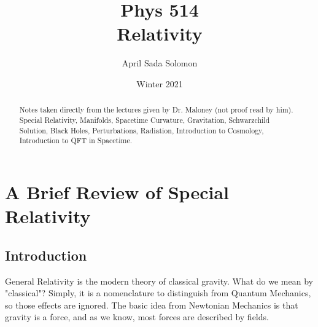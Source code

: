\documentclass{article}
\title{Phys 514 \\
	\large Relativity}
\author{April Sada Solomon}
\date{Winter 2021}
\begin{document}
	\clearpage
	\maketitle
	
	\vspace{2cm}
	
	\renewcommand{\abstractname}{Course Description}
	\begin{abstract}
		 Notes taken directly from the lectures given by Dr. Maloney (not proof read by him). Special Relativity, Manifolds, Spacetime Curvature, Gravitation, Schwarzchild Solution, Black Holes, Perturbations, Radiation, Introduction to Cosmology, Introduction to QFT in Spacetime. 
	\end{abstract}
	
	\newpage
	
	\tableofcontents
	
	\newpage
	
	\setcounter{page}{1}
	\cfoot{\thepage}
	
	\section{A Brief Review of Special Relativity}
	\subsection{Introduction}
 		General Relativity is the modern theory of classical gravity. What do we mean by "classical"? Simply, it is a nomenclature to distinguish from Quantum Mechanics, so those effects are ignored. The basic idea from Newtonian Mechanics is that gravity is a force, and as we know, most forces are described by fields.
 		
\end{document}
